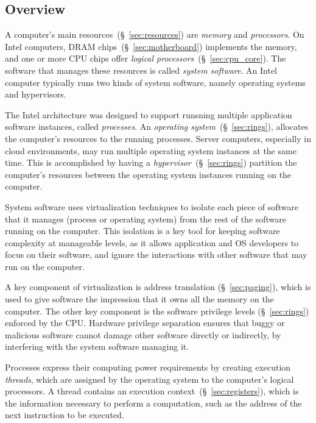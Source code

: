 \subsection{Overview}
\label{sec:background_overview}

A computer's main resources~(\S~\ref{sec:resources}) are \textit{memory} and
\textit{processors}. On Intel computers, DRAM
chips~(\S~\ref{sec:motherboard}) implements the memory, and one or more CPU
chips offer \textit{logical processors}~(\S~\ref{sec:cpu_core}). The software
that manages these resources is called \textit{system software}. An Intel
computer typically runs two kinds of system software, namely operating systems
and hypervisors.

The Intel architecture was designed to support runsning multiple application
software instances, called \textit{processes}. An
\textit{operating system}~(\S~\ref{sec:rings}), allocates the computer's
resources to the running processes. Server computers, especially in cloud
environments, may run multiple operating system instances at the same time.
This is accomplished by having a \textit{hypervisor}~(\S~\ref{sec:rings})
partition the computer's resources between the operating system instances
running on the computer.

System software uses virtualization techniques to isolate each piece of
software that it manages (process or operating system) from the rest of the
software running on the computer. This isolation is a key tool for keeping
software complexity at manageable levels, as it allows application and OS
developers to focus on their software, and ignore the interactions with other
software that may run on the computer.

A key component of virtualization is address translation (\S~\ref{sec:paging}),
which is used to give software the impression that it owns all the memory on
the computer. The other key component is the software privilege levels
(\S~\ref{sec:rings}) enforced by the CPU. Hardware privilege separation ensures
that buggy or malicious software cannot damage other software directly or
indirectly, by interfering with the system software managing it.

Processes express their computing power requirements by creating execution
\textit{threads}, which are assigned by the operating system to the computer's
logical processors. A thread contains an execution
context~(\S~\ref{sec:registers}), which is the information necessary to
perform a computation, such as the address of the next instruction to be
executed.

